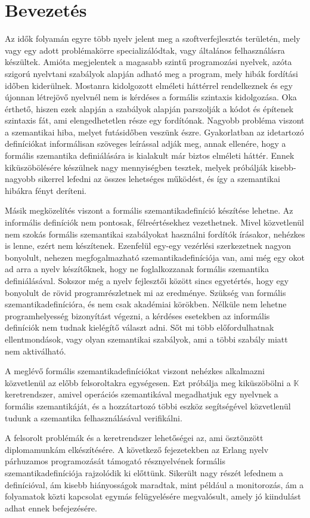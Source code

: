 \section{Bevezetés}
Az idők folyamán egyre több nyelv jelent meg a szoftverfejlesztés területén, mely vagy egy adott problémakörre specializálódtak, vagy általános felhasználásra készültek. Amióta megjelentek a magasabb szintű programozási nyelvek, azóta szigorú nyelvtani szabályok alapján adható meg a program, mely hibák fordítási időben kiderülnek. Mostanra kidolgozott elméleti háttérrel rendelkeznek és egy újonnan létrejövő nyelvnél nem is kérdéses a formális szintaxis kidolgozása. Oka érthető, hiszen ezek alapján a szabályok alapján parszolják a kódot és építenek szintaxis fát, ami elengedhetetlen része egy fordítónak. Nagyobb probléma viszont a szemantikai hiba, melyet futásidőben veszünk észre. Gyakorlatban az idetartozó definíciókat informálisan szöveges leírással adják meg, annak ellenére, hogy a formális szemantika definiálására is kialakult már biztos elméleti háttér. Ennek kiküszöbölésére készülnek nagy mennyiségben tesztek, melyek próbálják kisebb-nagyobb sikerrel lefedni az összes lehetséges működést, és így a szemantikai hibákra fényt deríteni.

Másik megközelítés viszont a formális szemantikadefiníció készítése lehetne. Az informális definíciók nem pontosak, félreértésekhez vezethetnek. Mivel közvetlenül nem szokás formális szemantikai szabályokat használni fordítók írásakor, nehézkes is lenne, ezért nem készítenek. Ezenfelül egy-egy vezérlési szerkezetnek nagyon bonyolult, nehezen megfogalmazható szemantikadefiníciója van, ami még egy okot ad arra a nyelv készítőknek, hogy ne foglalkozzanak formális szemantika definiálásával. Sokszor még a nyelv fejlesztői között sincs egyetértés, hogy egy bonyolult de rövid programrészletnek mi az eredménye. Szükség van formális szemantikadefinícióra, és nem csak akadémiai körökben. Nélküle nem lehetne programhelyesség bizonyítást végezni, a kérdéses esetekben az informális definíciók nem tudnak kielégítő választ adni. Sőt mi több előfordulhatnak ellentmondások, vagy olyan szemantikai szabályok, ami a többi szabály miatt nem aktiválható.

A meglévő formális szemantikadefiníciókat viszont nehézkes alkalmazni közvetlenül az előbb felsoroltakra egységesen. Ezt próbálja meg kiküszöbölni a $\mathbb{K}$ keretrendszer, amivel operációs szemantikával megadhatjuk egy nyelvnek a formális szemantikáját, és a hozzátartozó többi eszköz segítségével közvetlenül tudunk a szemantika felhasználásával verifikálni.

A felsorolt problémák és a keretrendszer lehetőségei az, ami ösztönzött diplomamunkám elkészítésére. A következő fejezetekben az Erlang nyelv párhuzamos programozását támogató résznyelvének formális szemantikadefiníciója rajzolódik ki előttünk. Sikerült nagy részét lefednem a definícióval, ám kisebb hiányosságok maradtak, mint például a monitorozás, ám a folyamatok közti kapcsolat egymás felügyelésére megvalósult, amely jó kiindulást adhat ennek befejezésére.
